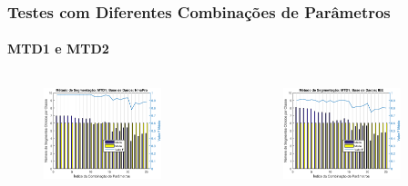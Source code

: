 \documentclass{beamer}
\begin{document}
	\begin{frame}
		\frametitle{Testes com Diferentes Combinações de Parâmetros}
		\framesubtitle{MTD1 e MTD2}
		\begin{columns}[c]
		

			\begin{figure}
				\begin{center}
					\includegraphics[width=0.8\textwidth]{./img/mtd1_nina.eps}
				\end{center}
			\end{figure}
			
			\begin{figure}
				\begin{center}
					\includegraphics[width=0.8\textwidth]{./img/mtd1_iee.eps}
				\end{center}
			\end{figure}
			
		

\end{columns}
\end{frame}
\end{document}
